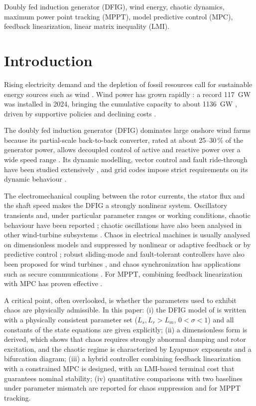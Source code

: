 \documentclass[conference]{IEEEtran}
\begin{document}
\begin{IEEEkeywords}
Doubly fed induction generator (DFIG), wind energy, chaotic dynamics, maximum power point tracking (MPPT), model predictive control (MPC), feedback linearization, linear matrix inequality (LMI).
\end{IEEEkeywords}

\section{Introduction}

Rising electricity demand and the depletion of fossil resources call for sustainable energy sources such as wind \cite{r1,r2,r3}. Wind power has grown rapidly \cite{r4}: a record 117~GW was installed in 2024, bringing the cumulative capacity to about 1136~GW \cite{r5}, driven by supportive policies and declining costs \cite{r6}.

The doubly fed induction generator (DFIG) dominates large onshore wind farms because its partial-scale back-to-back converter, rated at about 25--30\,\% of the generator power, allows decoupled control of active and reactive power over a wide speed range \cite{r7,r8,r9,r10,r11}. Its dynamic modelling, vector control and fault ride-through have been studied extensively \cite{r12,r13,r14,r15,r16}, and grid codes impose strict requirements on its dynamic behaviour \cite{r17,r18,r19}.

The electromechanical coupling between the rotor currents, the stator flux and the shaft speed makes the DFIG a strongly nonlinear system. Oscillatory transients \cite{r20} and, under particular parameter ranges or working conditions, chaotic behaviour have been reported \cite{r21,r22}; chaotic oscillations have also been analysed in other wind-turbine subsystems \cite{r23}. Chaos in electrical machines is usually analysed on dimensionless models \cite{r24,r25} and suppressed by nonlinear or adaptive feedback \cite{r24,r26,r27} or by predictive control \cite{r25,r28,r29,r30,r31}; robust sliding-mode and fault-tolerant controllers have also been proposed for wind turbines \cite{r32,r33}, and chaos synchronization has applications such as secure communications \cite{r34}. For MPPT, combining feedback linearization with MPC has proven effective \cite{r35}.

A critical point, often overlooked, is whether the parameters used to exhibit chaos are physically admissible. In this paper: (i) the DFIG model of \cite{r36} is written with a physically consistent parameter set ($L_s,L_r>L_m$, $0<\sigma<1$) and all constants of the state equations are given explicitly; (ii) a dimensionless form is derived, which shows that chaos requires strongly abnormal damping and rotor excitation, and the chaotic regime is characterized by Lyapunov exponents and a bifurcation diagram; (iii) a hybrid controller combining feedback linearization with a constrained MPC is designed, with an LMI-based terminal cost that guarantees nominal stability; (iv) quantitative comparisons with two baselines under parameter mismatch are reported for chaos suppression and for MPPT tracking.
\end{document}
